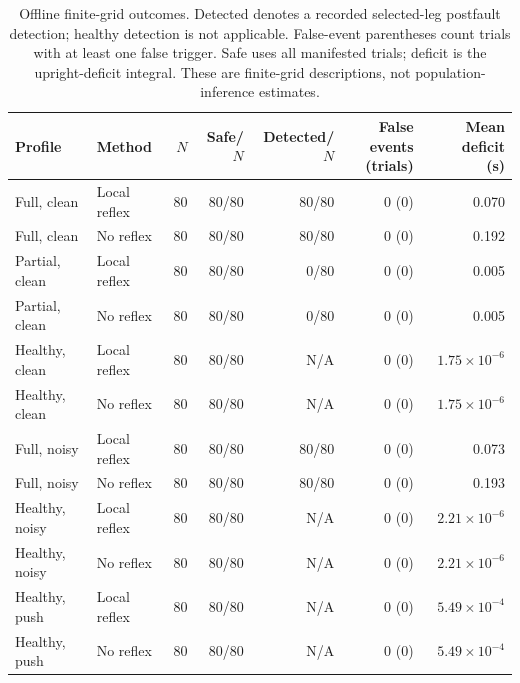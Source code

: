 \begin{table}[htbp]
\centering\small
\setlength{\tabcolsep}{3pt}
\caption{Offline finite-grid outcomes. Detected denotes a recorded selected-leg postfault detection; healthy detection is not applicable. False-event parentheses count trials with at least one false trigger. Safe uses all manifested trials; deficit is the upright-deficit integral. These are finite-grid descriptions, not population-inference estimates.}
\label{tab:v3_physics}
\begin{tabular}{llrrrrr}
\toprule
Profile & Method & $N$ & Safe/$N$ & Detected/$N$ & \shortstack{False events\\(trials)} & \shortstack{Mean deficit\\(s)} \\
\midrule
Full, clean & Local reflex & 80 & 80/80 & 80/80 & 0 (0) & 0.070 \\
Full, clean & No reflex & 80 & 80/80 & 80/80 & 0 (0) & 0.192 \\
Partial, clean & Local reflex & 80 & 80/80 & 0/80 & 0 (0) & 0.005 \\
Partial, clean & No reflex & 80 & 80/80 & 0/80 & 0 (0) & 0.005 \\
Healthy, clean & Local reflex & 80 & 80/80 & N/A & 0 (0) & $1.75\times10^{-6}$ \\
Healthy, clean & No reflex & 80 & 80/80 & N/A & 0 (0) & $1.75\times10^{-6}$ \\
Full, noisy & Local reflex & 80 & 80/80 & 80/80 & 0 (0) & 0.073 \\
Full, noisy & No reflex & 80 & 80/80 & 80/80 & 0 (0) & 0.193 \\
Healthy, noisy & Local reflex & 80 & 80/80 & N/A & 0 (0) & $2.21\times10^{-6}$ \\
Healthy, noisy & No reflex & 80 & 80/80 & N/A & 0 (0) & $2.21\times10^{-6}$ \\
Healthy, push & Local reflex & 80 & 80/80 & N/A & 0 (0) & $5.49\times10^{-4}$ \\
Healthy, push & No reflex & 80 & 80/80 & N/A & 0 (0) & $5.49\times10^{-4}$ \\
\bottomrule
\end{tabular}
\end{table}
